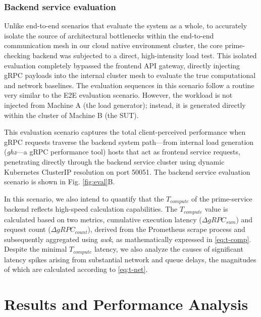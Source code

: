 \documentclass{ieeeaccess}
\begin{document}
	\subsubsection{Backend service evaluation}
	Unlike end-to-end scenarios that evaluate the system as a whole, to accurately isolate the source of architectural bottlenecks within the end-to-end communication mesh in our cloud native environment cluster, the core prime-checking backend was subjected to a direct, high-intensity load test. This isolated evaluation completely bypassed the frontend API gateway, directly injecting gRPC payloads into the internal cluster mesh to evaluate the true computational and network baselines. The evaluation sequences in this scenario follow a routine very similar to the E2E evaluation scenario. However, the workload is not injected from Machine A (the load generator); instead, it is generated directly within the cluster of Machine B (the SUT).
	
	This evaluation scenario captures the total client-perceived performance when gRPC requests traverse the backend system path—from internal load generation (\textit{ghz}—a gRPC performance tool) hosts that act as frontend service requests, penetrating directly through the backend service cluster using dynamic Kubernetes ClusterIP resolution on port 50051. The backend service evaluation scenario is shown in Fig. \ref{fig:eval}B.
	
	In this scenario, we also intend to quantify that the $T_{compute}$ of the prime-service backend reflects high-speed calculation capabilities. The $T_{compute}$ value is calculated based on two metrics, cumulative execution latency ($\Delta gRPC_{sum}$) and request count ($\Delta gRPC_{count}$), derived from the Prometheus scrape process and subsequently aggregated using \textit{awk}, as mathematically expressed in \eqref{eq:t-comp}. Despite the minimal $T_{compute}$ latency, we also analyze the causes of significant latency spikes arising from substantial network and queue delays, the magnitudes of which are calculated according to \eqref{eq:t-net}.
	
	
	
	\section{Results and Performance Analysis}
	\label{sec:results}
	
\end{document}
